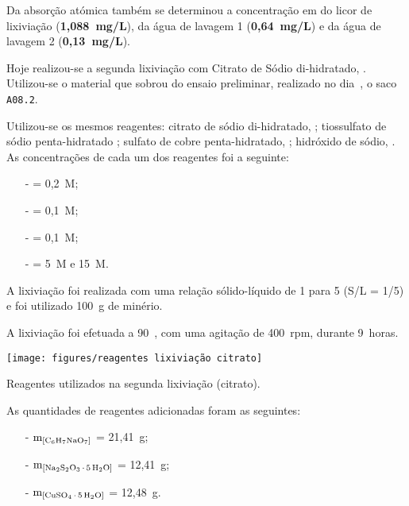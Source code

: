 Da absorção atómica também se determinou a concentração em  do licor de lixiviação (\textbf{1,088~mg/L}), da água de lavagem 1 (\textbf{0,64~mg/L}) e da água de lavagem 2 (\textbf{0,13~mg/L}).

\hrulefill

\label{day:11-dezembro-2024}

Hoje realizou-se a segunda lixiviação com Citrato de Sódio di-hidratado, \citratodi{}. Utilizou-se o material que sobrou do ensaio preliminar, realizado no dia~, o saco \texttt{A08.2}.

Utilizou-se os mesmos reagentes: citrato de sódio di-hidratado, \citratodi{}; tiossulfato de sódio penta-hidratado \tsp{}; sulfato de cobre penta-hidratado, \sulfcu{}; hidróxido de sódio, \hidso{}.
As concentrações de cada um dos reagentes foi a seguinte:

\begin{itemize}
	\item[-] \citratodi{} = 0,2~M;
	\item[-] \tsp{} = 0,1~M;
	\item[-] \sulfcu{} = 0,1~M;
	\item[-] \hidso{} = 5~M e 15~M.
\end{itemize}

A lixiviação foi realizada com uma relação sólido-líquido de 1 para 5 (S/L = 1/5) e foi utilizado 100~g de minério.

A lixiviação foi efetuada a 90~\graus{}, com uma agitação de 400~rpm, durante 9~horas.

\begin{marginfigure}
	\centering
	\texttt{[image: figures/reagentes lixiviação citrato]}
	\caption{Reagentes utilizados na segunda lixiviação (citrato).}
	\label{fig:reagentes-lix-citrato2}
\end{marginfigure}

As quantidades de reagentes adicionadas foram as seguintes:

\begin{itemize}
	\item[-] $\mathrm{m}_{\left[\citratodi{}\right]}$ = 21,41~g;
	\item[-] $\mathrm{m}_{\left[\tsp{}\right]}$ = 12,41~g;
	\item[-] $\mathrm{m}_{\left[\sulfcu{}\right]}$ = 12,48~g.
\end{itemize}

